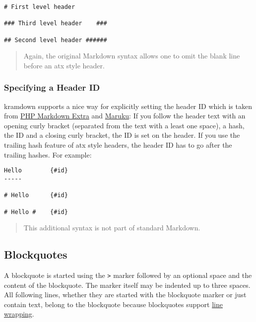 \documentclass[a4paper]{article}
\begin{document}
\begin{verbatim}
# First level header

### Third level header    ###

## Second level header ######
\end{verbatim}

\begin{quote}
Again, the original Markdown syntax allows one to omit the blank line
before an atx style header.
\end{quote}

\hypertarget{specifying-a-header-id}{\subsubsection{Specifying a Header
ID}\label{specifying-a-header-id}}

kramdown supports a nice way for explicitly setting the header ID which
is taken from \href{http://michelf.com/projects/php-markdown/extra/}{PHP
Markdown Extra} and \href{http://maruku.rubyforge.org}{Maruku}: If you
follow the header text with an opening curly bracket (separated from the
text with a least one space), a hash, the ID and a closing curly
bracket, the ID is set on the header. If you use the trailing hash
feature of atx style headers, the header ID has to go after the trailing
hashes. For example:

\begin{verbatim}
Hello        {#id}
-----

# Hello      {#id}

# Hello #    {#id}
\end{verbatim}

\begin{quote}
This additional syntax is not part of standard Markdown.
\end{quote}

\hypertarget{blockquotes}{\subsection{Blockquotes}\label{blockquotes}}

A blockquote is started using the \texttt{\textgreater{}} marker
followed by an optional space and the content of the blockquote. The
marker itself may be indented up to three spaces. All following lines,
whether they are started with the blockquote marker or just contain
text, belong to the blockquote because blockquotes support
\protect\hyperlink{line-wrapping}{line wrapping}.
\end{document}
